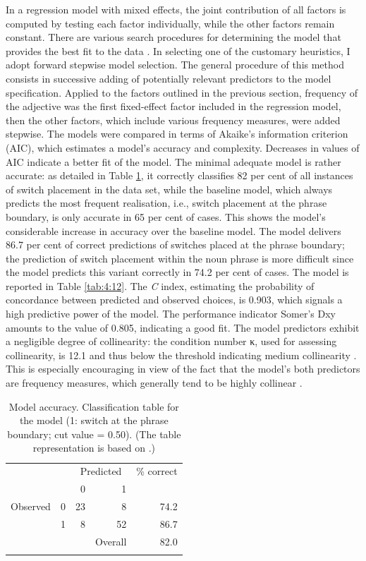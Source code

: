 In a regression model with mixed effects, the joint contribution of all factors is computed by testing each factor individually, while the other factors remain constant. There are various search procedures for determining the model that provides the best fit to the data \citep[cf.][]{baayen-2013}. In selecting one of the customary heuristics, I adopt forward stepwise model selection. The general procedure of this method consists in successive adding of potentially relevant predictors to the model specification. Applied to the factors outlined in the previous section, frequency of the adjective was the first fixed-effect factor included in the regression model, then the other factors, which include various frequency measures, were added stepwise. The models were compared in terms of Akaike's information criterion (AIC), which estimates a model's accuracy and complexity. Decreases in values of AIC indicate a better fit of the model. The minimal adequate model is rather accurate: as detailed in Table \ref{tab:4:11}, it correctly classifies 82 per cent of all instances of switch placement in the data set, while the baseline model, which always predicts the most frequent realisation, i.e., switch placement at the phrase boundary, is only accurate in 65 per cent of cases. This shows the model's considerable increase in accuracy over the baseline model. The model delivers 86.7 per cent of correct predictions of switches placed at the phrase boundary; the prediction of switch placement within the noun phrase is more difficult since the model predicts this variant correctly in 74.2 per cent of cases. The  model is reported in Table \ref{tab:4:12}. The \textit{C} index, estimating the probability of concordance between predicted and observed choices, is 0.903, which signals a high predictive power of the model. The performance indicator Somer's Dxy amounts to the value of 0.805, indicating a good fit. The model predictors exhibit a negligible degree of collinearity: the condition number κ, used for assessing collinearity, is 12.1 and thus below the threshold indicating medium collinearity \citep[cf.][182]{baayen-analyzing}. This is especially encouraging in view of the fact that the model's both predictors are frequency measures, which generally tend to be highly collinear \citep{baayen-2013}.

\begin{table}
		\begin{tabular}{l *{4}{r}} 
		\lsptoprule
 			& & \multicolumn{2}{c}{Predicted} & \% correct\\\cmidrule(lr){3-4}
			  & &0 &1 &\\ \midrule
			Observed  & 0     &23   &8 &74.2\\
			 &1 &8 &52 &86.7\\
			 & & &Overall &82.0\\
			 \lspbottomrule
		\end{tabular}
\caption{Model accuracy. Classification table for the model (1: switch at the phrase boundary; cut value = 0.50). (The table representation is based on   \citealt{bresnan-etal}.)\label{tab:4:11}}
\end{table}

